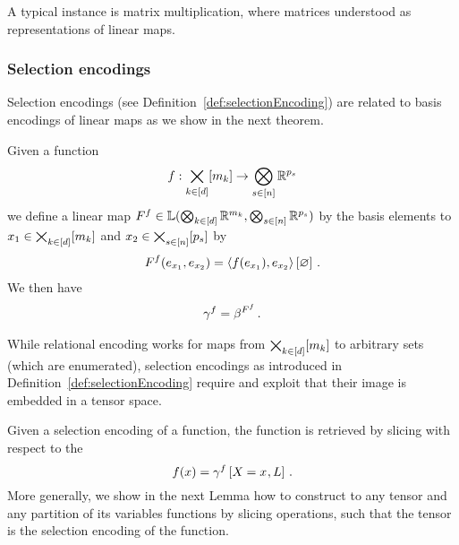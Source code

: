A typical instance is matrix multiplication, where matrices understood as representations of linear maps.


\subsubsection{Selection encodings}

Selection encodings (see Definition~\ref{def:selectionEncoding}) are related to basis encodings of linear maps as we show in the next theorem.

\begin{theorem}\label{the:selectionToBasisEncoding}
	Given a function 
		\[ f : \bigtimes_{k\in[d]}[m_{k}] \rightarrow \bigotimes_{s\in[n]}\mathbb{R}^{p_{s}} \]
	we define a linear map $F^{f}\in\mathbb{L}(\bigotimes_{k\in[d]} \mathbb{R}^{m_{k}},\bigotimes_{s\in[n]}\mathbb{R}^{p_{s}})$ by the basis elements to $x_{1} \in\bigtimes_{k\in[d]}[m_{k}]$ and $x_{2}\in\bigtimes_{s\in[n]}[p_{s}]$ by
	\begin{align*}
	 	F^{f}(e_{x_{1}},e_{x_{2}}) 
		= \left\langle f(e_{x_{1}}),e_{x_{2}}\right\rangle \left[ \varnothing \right] \, .  
	\end{align*}
	We then have
	\begin{align*}
		\gamma^{f} = \beta^{F^{f}} \, . 
	\end{align*}
\end{theorem}





While relational encoding works for maps from $\bigtimes_{k\in[d]}[m_{k}]$ to arbitrary sets (which are enumerated), selection encodings as introduced in Definition~\ref{def:selectionEncoding} require and exploit that their image is embedded in a tensor space.

Given a selection encoding of a function, the function is retrieved by slicing with respect to the 
	\[ f(x) = \gamma^{f}\left[X_{}=x_{},L\right] \, . \]
More generally, we show in the next Lemma how to construct to any tensor and any partition of its variables functions by slicing operations, such that the tensor is the selection encoding of the function.

